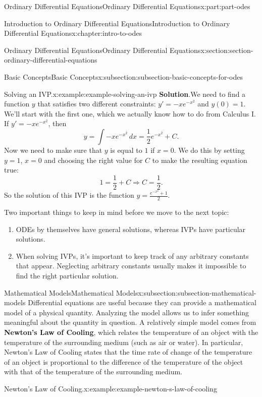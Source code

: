 \documentclass[oneside,10pt,]{book}
\newcommand{\blocktitlefont}{\relax}
\newcommand{\terminology}[1]{\textbf{#1}}
\numberwithin{equation}{part}
\begin{document}
\begin{partptx}{Ordinary Differential Equations}{}{Ordinary Differential Equations}{}{}{x:part:part-odes}
\begin{chapterptx}{Introduction to Ordinary Differential Equations}{}{Introduction to Ordinary Differential Equations}{}{}{x:chapter:intro-to-odes}
\begin{sectionptx}{Ordinary Differential Equations}{}{Ordinary Differential Equations}{}{}{x:section:section-ordinary-differential-equations}
\begin{subsectionptx}{Basic Concepts}{}{Basic Concepts}{}{}{x:subsection:subsection-basic-concepts-for-odes}
\begin{example}{Solving an IVP.}{x:example:example-solving-an-ivp}
\noindent\textbf{\blocktitlefont Solution}.\hypertarget{g:solution:idp105548778900640}{}\quad{}We need to find a function \(y\) that satisfies two different constraints: \(y' = -xe^{-x^{2}}\) and \(y(0)=1\). We'll start with the first one, which we actually know how to do from Calculus I. If \(y' = -xe^{-x^{2}}\), then%
\begin{equation*}
y = \int -xe^{-x^{2}}\,dx = \frac{1}{2}e^{-x^{2}}+C.
\end{equation*}
Now we need to make sure that \(y\) is equal to \(1\) if \(x=0\). We do this by setting \(y=1\), \(x=0\) and choosing the right value for \(C\) to make the resulting equation true:%
\begin{equation*}
1 = \frac{1}{2} + C \Rightarrow C = \frac{1}{2}.
\end{equation*}
So the solution of this IVP is the function \(y = \frac{e^{-x^{2}}+1}{2}\).%
\end{example}
Two important things to keep in mind before we move to the next topic:%
\begin{enumerate}
\item{}ODEs by themselves have general solutions, whereas IVPs have particular solutions.%
\item{}When solving IVPs, it's important to keep track of any arbitrary constants that appear. Neglecting arbitrary constants usually makes it impossible to find the right particular solution.%
\end{enumerate}
%
\end{subsectionptx}
%
%
\typeout{************************************************}
\typeout{************************************************}
%
\begin{subsectionptx}{Mathematical Models}{}{Mathematical Models}{}{}{x:subsection:subsection-mathematical-models}
Differential equations are useful because they can provide a mathematical model of a physical quantity. Analyzing the model allows us to infer something meaningful about the quantity in question. A relatively simple model comes from \terminology{Newton's Law of Cooling}, which relates the temperature of an object with the temperature of the surrounding medium (such as air or water). In particular, Newton's Law of Cooling states that the time rate of change of the temperature of an object is proportional to the difference of the temperature of the object with that of the temperature of the surrounding medium.%
\begin{example}{Newton's Law of Cooling.}{x:example:example-newton-s-law-of-cooling}%

\end{example}
\end{subsectionptx}
\end{sectionptx}
\end{chapterptx}
\end{partptx}
\end{document}
